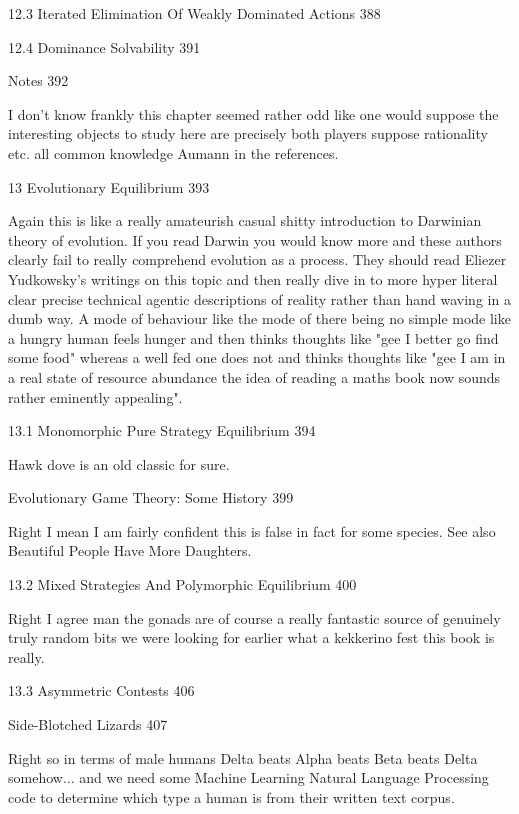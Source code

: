 12.3 Iterated Elimination Of Weakly Dominated Actions 388



12.4 Dominance Solvability 391



Notes 392

I don't know frankly this chapter seemed rather odd like one would suppose the interesting objects to study here are precisely both players suppose rationality etc. all common knowledge Aumann in the references.

13 Evolutionary Equilibrium 393

Again this is like a really amateurish casual shitty introduction to Darwinian theory of evolution. If you read Darwin you would know more and these authors clearly fail to really comprehend evolution as a process. They should read Eliezer Yudkowsky's writings on this topic and then really dive in to more hyper literal clear precise technical agentic descriptions of reality rather than hand waving in a dumb way. A mode of behaviour like the mode of there being no simple mode like a hungry human feels hunger and then thinks thoughts like "gee I better go find some food" whereas a well fed one does not and thinks thoughts like "gee I am in a real state of resource abundance the idea of reading a maths book now sounds rather eminently appealing".

13.1 Monomorphic Pure Strategy Equilibrium 394

Hawk dove is an old classic for sure.

Evolutionary Game Theory: Some History 399

Right I mean I am fairly confident this is false in fact for some species. See also Beautiful People Have More Daughters.

13.2 Mixed Strategies And Polymorphic Equilibrium 400

Right I agree man the gonads are of course a really fantastic source of genuinely truly random bits we were looking for earlier what a kekkerino fest this book is really.

13.3 Asymmetric Contests 406



Side-Blotched Lizards 407

Right so in terms of male humans Delta beats Alpha beats Beta beats Delta somehow... and we need some Machine Learning Natural Language Processing code to determine which type a human is from their written text corpus.

